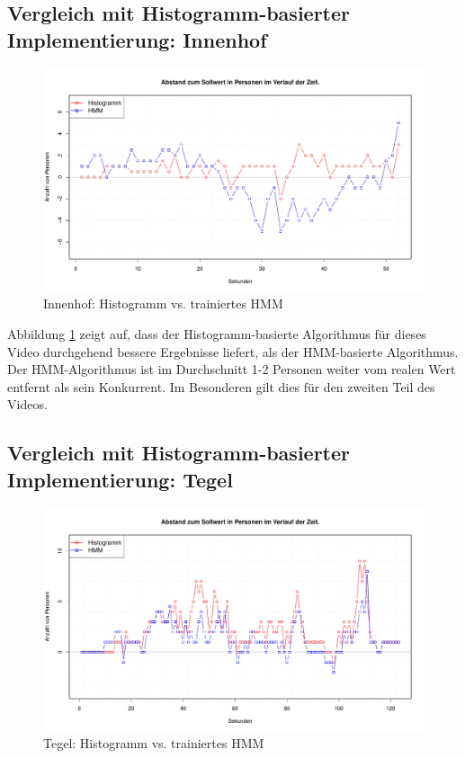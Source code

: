 \subsection{Vergleich mit Histogramm-basierter Implementierung: Innenhof}
\label{sec:eval_innenhof}

\begin{figure}
	\centering
\includegraphics[width=1\textwidth]{bilder/innenhof_910-1000_histo_vs_hmm_prelearned.pdf}
\caption{Innenhof: Histogramm vs. trainiertes HMM}
	\label{fig:Innenhof}
\end{figure}

Abbildung \ref{fig:Innenhof} zeigt auf, dass der Histogramm-basierte Algorithmus für dieses Video durchgehend bessere Ergebnisse liefert, als der HMM-basierte Algorithmus. Der HMM-Algorithmus ist im Durchschnitt 1-2 Personen weiter vom realen Wert entfernt als sein Konkurrent. Im Besonderen gilt dies für den zweiten Teil des Videos.

\subsection{Vergleich mit Histogramm-basierter Implementierung: Tegel}
\label{sec:eval:tegel}

\begin{figure}
	\centering
\includegraphics[width=1\textwidth]{bilder/tegel_7-55_histo_vs_prelearned_hmm.pdf}
	\caption{Tegel: Histogramm vs. trainiertes HMM}
	\label{fig:tegel}
\end{figure}

